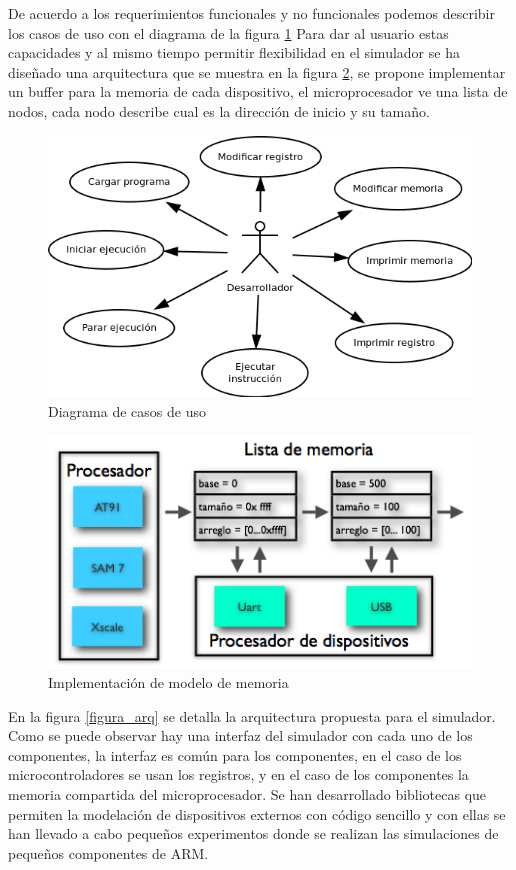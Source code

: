 De acuerdo a los requerimientos funcionales y no funcionales podemos describir los casos de uso con el diagrama de la figura \ref{Flo:uso}
Para dar al usuario estas capacidades y al mismo tiempo permitir flexibilidad en el simulador se ha diseñado una arquitectura que se muestra en la figura \ref{Flo:implementacion_memoria}, se propone implementar un buffer para la memoria de cada dispositivo, el microprocesador ve una lista de nodos, cada nodo describe cual es la dirección de inicio y su tamaño.	

\begin{figure}
\includegraphics[scale=0.5]{img/uso}\caption{Diagrama de casos de uso}
\label{Flo:uso}
\end{figure}

\begin{figure}
\includegraphics[scale=0.7]{img/implementacion_memoria}\caption{Implementación de modelo de memoria}
\label{Flo:implementacion_memoria}
\end{figure}

En la figura \ref{figura_arq} se detalla la arquitectura propuesta para el simulador.
Como se puede observar hay una interfaz del simulador con cada uno de los componentes, la interfaz es común para los componentes, en el caso de los microcontroladores se usan los registros, y en el caso de los componentes la memoria compartida del microprocesador.
Se han desarrollado bibliotecas que permiten la modelación de dispositivos externos con código sencillo y con ellas se han llevado a cabo pequeños experimentos donde se realizan las simulaciones de pequeños componentes de \ac{ARM}.

